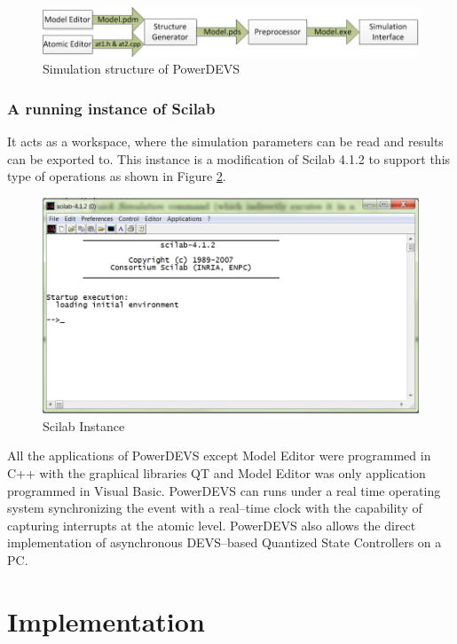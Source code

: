 \documentclass[titlepage]{report}%
\newcommand{\pd}{\texttt{PowerDEVS}~}
\begin{document}
\begin{figure}[h!]
  \centering
    \includegraphics[width=1\textwidth]{Fig9.png}
    \caption{Simulation structure of PowerDEVS}
    \label{sim_st}
\end{figure}

 
\subsection{A running instance of Scilab}

It acts as a workspace, where the simulation parameters can be read and results can be exported to. This instance is a modification of Scilab 4.1.2 to support this type of operations as shown in Figure \ref{sci_in}.

\begin{figure}[ht!]
  \centering
    \includegraphics[width=1\textwidth]{Fig10.png}
    \caption{Scilab Instance}
    \label{sci_in}
\end{figure}

All the applications of PowerDEVS except Model Editor were programmed in C++ with the graphical libraries QT and Model Editor was only application programmed in Visual Basic. PowerDEVS can runs under a real time operating system \cite{ManRTI} synchronizing the event with a real–time clock with the capability of capturing interrupts at the atomic level. PowerDEVS also allows the direct implementation of asynchronous DEVS–based Quantized State Controllers \cite{Kof03b} on a PC.


\chapter{Implementation}
\end{document}
